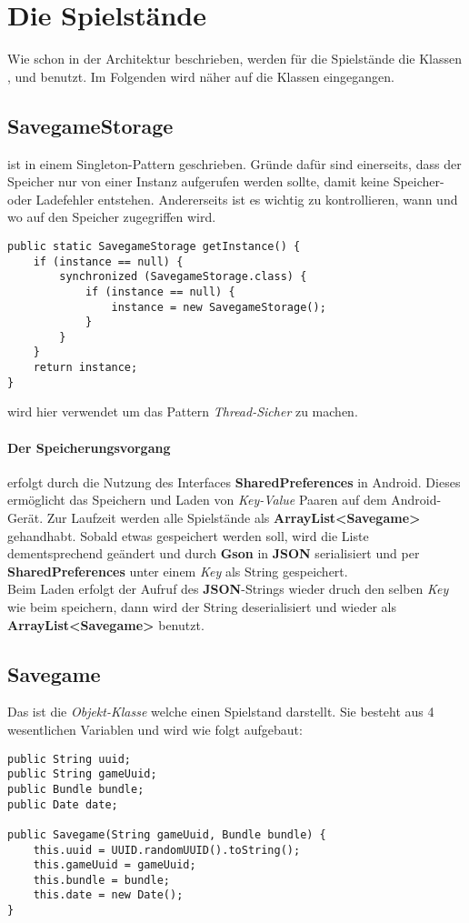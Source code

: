 \section{Die Spielstände}
\sectionauthor{\leonard}

Wie schon in der Architektur beschrieben, werden für die Spielstände die Klassen 
,  und  benutzt.
Im Folgenden wird näher auf die Klassen eingegangen.

\subsection{SavegameStorage}
ist in einem Singleton-Pattern geschrieben. Gründe dafür sind einerseits, dass 
der Speicher nur von einer Instanz aufgerufen werden sollte, damit keine 
Speicher- oder Ladefehler entstehen. Andererseits ist es wichtig zu kontrollieren, 
wann und wo auf den Speicher zugegriffen wird. 
\begin{lstlisting}[caption={SavegameStorage Singleton},captionpos=b]
public static SavegameStorage getInstance() {
	if (instance == null) {
		synchronized (SavegameStorage.class) {
			if (instance == null) {
				instance = new SavegameStorage();
			}
		}
	}
	return instance;
}
\end{lstlisting}
 wird hier verwendet um das Pattern \emph{Thread-Sicher} zu 
machen.

\paragraph{Der Speicherungsvorgang} erfolgt durch die Nutzung des Interfaces  
\textbf{SharedPreferences} in Android. Dieses ermöglicht das Speichern und Laden von 
\emph{Key-Value} Paaren auf dem Android-Gerät. Zur Laufzeit werden alle Spielstände 
als \textbf{ArrayList\textless Savegame\textgreater} gehandhabt. Sobald etwas 
gespeichert werden soll, wird die Liste dementsprechend geändert und durch 
\textbf{Gson} in \textbf{JSON} serialisiert und per \textbf{SharedPreferences} 
unter einem \emph{Key} als String gespeichert.\\
Beim Laden erfolgt der Aufruf des \textbf{JSON}-Strings wieder druch den selben 
\emph{Key} wie beim speichern, dann wird der String deserialisiert und wieder als 
\textbf{ArrayList\textless Savegame\textgreater} benutzt.

\subsection{Savegame}
Das ist die \emph{Objekt-Klasse} welche einen Spielstand darstellt. Sie besteht 
aus 4 wesentlichen Variablen und wird wie folgt aufgebaut:
\begin{lstlisting}[caption={Savegame Variablen \& Konstruktor},captionpos=b]
public String uuid;
public String gameUuid;
public Bundle bundle;
public Date date;

public Savegame(String gameUuid, Bundle bundle) {
	this.uuid = UUID.randomUUID().toString();
	this.gameUuid = gameUuid;
	this.bundle = bundle;
	this.date = new Date();
}
\end{lstlisting}

